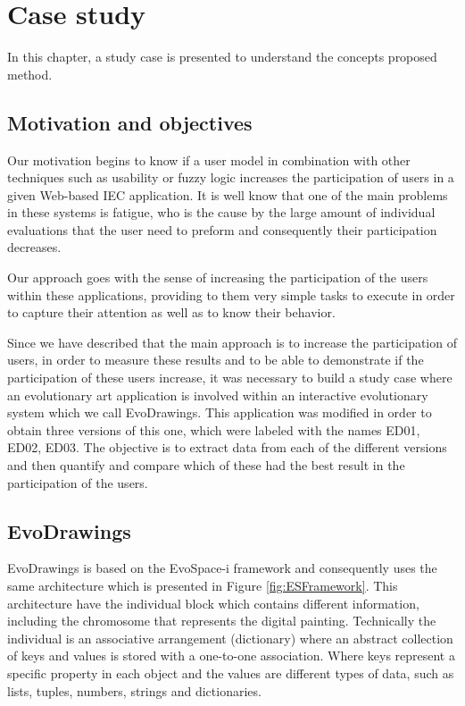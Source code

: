 \chapter{Case study}

In this chapter, a study case is presented to understand the concepts proposed
method.

\section{Motivation and objectives}

Our motivation begins to know if a user model in combination with
other techniques such as usability or fuzzy logic increases the participation of users in a
given Web-based IEC application. It is well know that one of the main
problems in these systems is fatigue, who is the cause by the large
amount of individual evaluations
that the user need to preform and consequently their participation decreases.

Our approach goes with the sense of increasing the participation of the users
within these applications, providing to them very simple tasks to execute in order to
capture their attention as well as to know their behavior.


Since we have described that the main approach is to increase the participation
of users, in order to measure these results and to be able to demonstrate
if the participation
of these users increase, it was necessary to build a study
case where an evolutionary art application is involved within an interactive
evolutionary system which we call EvoDrawings. This application was modified in
order to obtain three versions of this one, which were labeled with the names
ED01, ED02, ED03. The objective is to extract data from each of the different
versions and then quantify and compare which of these had the best result in the
participation of the users.

\section{EvoDrawings} EvoDrawings is based on the EvoSpace-i framework and
consequently uses the same architecture which is presented in Figure
\ref{fig:ESFramework}. This architecture have the individual block which
contains different information, including the chromosome that represents the
digital painting. Technically the individual is an associative arrangement
(dictionary) where an abstract collection of keys and values is stored with a
one-to-one association. Where keys represent a specific property in each object
and the values are different types of data, such as lists, tuples, numbers,
strings and dictionaries.

